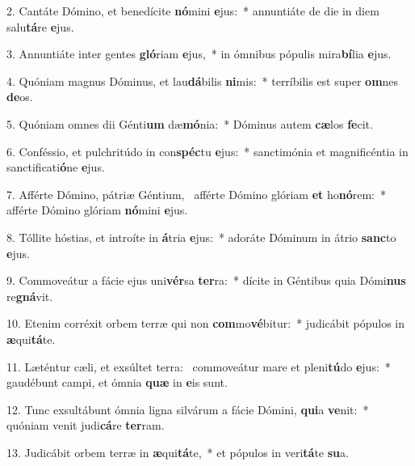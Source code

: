 2. Cantáte Dómino, et benedícite \textbf{nó}mini \textbf{e}jus:~*  annuntiáte de die in diem salu\textbf{tá}re \textbf{e}jus.\

3. Annuntiáte inter gentes \textbf{gló}riam \textbf{e}jus,~*  in ómnibus pópulis mira\textbf{bí}lia \textbf{e}jus.\

4. Quóniam magnus Dóminus, et lau\textbf{dá}bilis \textbf{ni}mis:~*  terríbilis est super \textbf{om}nes \textbf{de}os.\

5. Quóniam omnes dii Génti\textbf{um} dæ\textbf{mó}nia:~*  Dóminus autem \textbf{cæ}los \textbf{fe}cit.\

6. Conféssio, et pulchritúdo in con\textbf{spéc}tu \textbf{e}jus:~*  sanctimónia et magnificéntia in sanctificati\textbf{ó}ne \textbf{e}jus.\

7. Afférte Dómino, pátriæ Géntium, \dag\  afférte Dómino glóriam \textbf{et} ho\textbf{nó}rem:~*  afférte Dómino glóriam \textbf{nó}mini \textbf{e}jus.\

8. Tóllite hóstias, et introíte in \textbf{á}tria \textbf{e}jus:~*  adoráte Dóminum in átrio \textbf{sanc}to \textbf{e}jus.\

9. Commoveátur a fácie ejus uni\textbf{vér}sa \textbf{ter}ra:~*  dícite in Géntibus quia Dómi\textbf{nus} re\textbf{gná}vit.\

10. Etenim corréxit orbem terræ qui non \textbf{com}mo\textbf{vé}bitur:~*  judicábit pópulos in \textbf{æ}qui\textbf{tá}te.\

11. Læténtur cæli, et exsúltet terra: \dag\  commoveátur mare et pleni\textbf{tú}do \textbf{e}jus:~*  gaudébunt campi, et ómnia \textbf{quæ} in \textbf{e}is sunt.\

12. Tunc exsultábunt ómnia ligna silvárum a fácie Dómini, \textbf{qui}a \textbf{ve}nit:~*  quóniam venit judi\textbf{cá}re \textbf{ter}ram.\

13. Judicábit orbem terræ in \textbf{æ}qui\textbf{tá}te,~*  et pópulos in veri\textbf{tá}te \textbf{su}a.\

